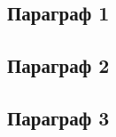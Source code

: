 \documentclass[../main.tex]{subfiles}
\begin{document}
  \subsection{Параграф 1}

  \subsection{Параграф 2}

  \subsection{Параграф 3}
\end{document}
